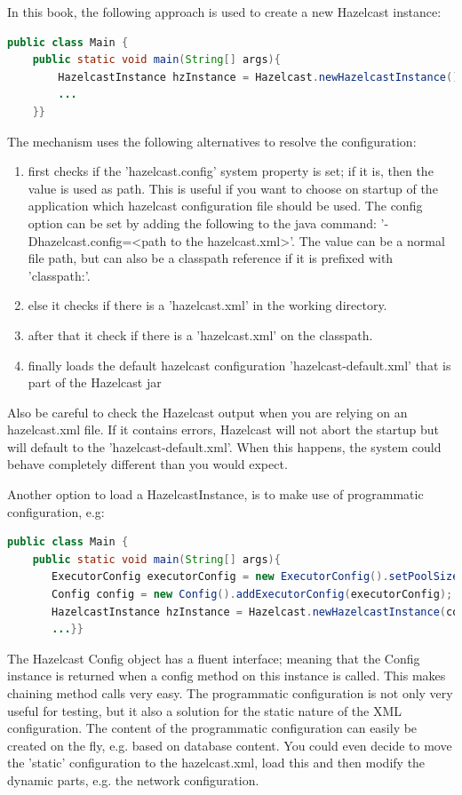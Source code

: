 In this book, the following approach is used to create a new Hazelcast instance:
\begin{lstlisting}[language=java]
public class Main {
    public static void main(String[] args){
        HazelcastInstance hzInstance = Hazelcast.newHazelcastInstance();
        ...
    }}
\end{lstlisting}
The mechanism uses the following alternatives to resolve the configuration:
\begin{enumerate}
\item first checks if the 'hazelcast.config' system property is set; if it is, then the value is used as path. This is useful if you want to choose on startup of the application which hazelcast configuration file should be used. The config option can be set by adding the following to the java command: '-Dhazelcast.config=<path to the hazelcast.xml>'. The value can be a normal file path, but can also be a classpath reference if it is prefixed with 'classpath:'. 
\item else it checks if there is a 'hazelcast.xml' in the working directory.
\item after that it check if there is a 'hazelcast.xml' on the classpath. 
\item finally loads the default hazelcast configuration 'hazelcast-default.xml' that is part of the Hazelcast jar
\end{enumerate}
Also be careful to check the Hazelcast output when you are relying on an hazelcast.xml file. If it contains errors, Hazelcast will not abort the startup but will default to the 'hazelcast-default.xml'. When this happens, the system could behave completely different than you would expect.

Another option to load a HazelcastInstance, is to make use of programmatic configuration, e.g: 
\begin{lstlisting}[language=java]
public class Main {
    public static void main(String[] args){
       ExecutorConfig executorConfig = new ExecutorConfig().setPoolSize(10);
       Config config = new Config().addExecutorConfig(executorConfig);	  
       HazelcastInstance hzInstance = Hazelcast.newHazelcastInstance(config);
       ...}}
\end{lstlisting}
The Hazelcast Config object has a fluent interface; meaning that the Config instance is returned when a config method on this instance is called. This makes chaining method calls very easy. The programmatic configuration is not only very useful for testing, but it also a solution for the static nature of the XML configuration. The content of the programmatic configuration can easily be created on the fly, e.g. based on database content. You could even decide to move the 'static' configuration to the hazelcast.xml, load this and then modify the dynamic parts, e.g. the network configuration.

